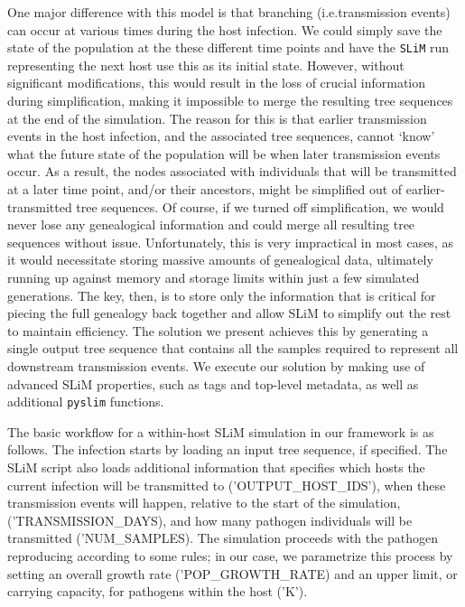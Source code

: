 \documentclass[12pt]{article}
\newcommand{\slim}[0]{\texttt{SLiM}\xspace}
\newcommand{\pyslim}[0]{\texttt{pyslim}\xspace}
\newcommand*{\ie}{i.e.\xcomma}
\begin{document}
One major difference with this model is that branching (\ie transmission events) can occur at various times during the host infection.
We could simply save the state of the population at the these different time points and have the \slim run representing the next host use this
as its initial state. However, without significant modifications, this would result in the loss of crucial information during simplification, making it impossible
to merge the resulting tree sequences at the end of the simulation. The reason for this is that earlier transmission events in the host infection, and
the associated tree sequences, cannot `know' what the future state of the population will be when later transmission events occur. As a result, the nodes associated with
individuals that will be transmitted at a later time point, and/or their ancestors, might be simplified out of earlier-transmitted tree sequences. Of course, if we turned off
simplification, we would never lose any genealogical information and could merge all resulting tree sequences without issue. Unfortunately, this is very impractical in most cases,
as it would necessitate storing massive amounts of genealogical data, ultimately running up against memory and storage limits within just a few simulated generations.
The key, then, is to store only the information that is critical for piecing the full genealogy back together and allow SLiM to simplify out the rest to maintain efficiency. The
solution we present achieves this by generating a single output tree sequence that contains all the samples required to represent all downstream transmission events.
We execute our solution by making use of advanced SLiM properties, such as tags and top-level metadata, as well as additional \pyslim functions.

The basic workflow for a within-host SLiM simulation in our framework is as follows. The infection starts by loading an input tree sequence, if specified. The SLiM script also
loads additional information that specifies which hosts the current infection will be transmitted to ('OUTPUT\_HOST\_IDS'), when these transmission events will happen, relative
to the start of the simulation, ('TRANSMISSION\_DAYS), and how many pathogen individuals will be transmitted ('NUM\_SAMPLES). The simulation proceeds with the pathogen reproducing according
to some rules; in our case, we parametrize this process by setting an overall growth rate ('POP\_GROWTH\_RATE) and an upper limit, or carrying capacity, for pathogens
within the host ('K').
\end{document}
